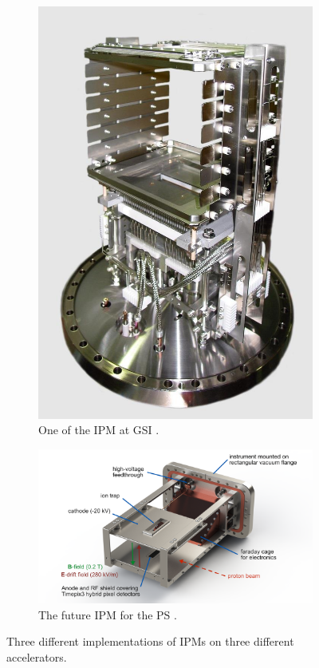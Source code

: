 \begin{figure}[!ht]
\begin{subfigure}[t]{0.45\textwidth}
    \includegraphics[width=\textwidth]{02_BeamDiag/figures/fig000_IPM_2}
    \caption[One of the IPM at GSI]{One of the IPM at GSI \cite{ForckJUAS}.}
    \label{}
  \end{subfigure}
  
  \begin{subfigure}[t]{1\textwidth}
    \includegraphics[width=\textwidth]{02_BeamDiag/figures/fig000_IPM_3}
    \caption[The future IPM for the PS]{The future IPM for the PS \cite{Storey2017}.}
    \label{}
  \end{subfigure}
  \caption[Three different implementations of IPMs on three different accelerators]{Three different implementations of IPMs on three different accelerators.}
  \label{chap2:fig:IPM_3}
\end{figure}
